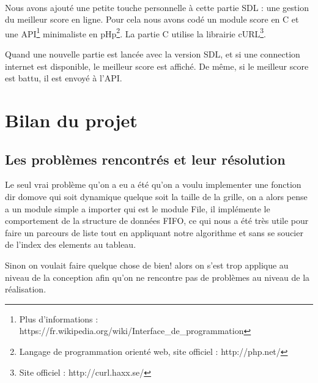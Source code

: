 \documentclass[12pt]{article}
\begin{document}
{\\

Nous avons ajouté une petite touche personnelle à cette partie SDL : une gestion du meilleur score en ligne.
Pour cela nous avons codé un module score en C et une API\footnote{Plus d'informations : https://fr.wikipedia.org/wiki/Interface\_de\_programmation} minimaliste en pHp\footnote{Langage de programmation orienté web, site officiel : http://php.net/}. La partie C utilise la librairie cURL\footnote{Site officiel : http://curl.haxx.se/}.

Quand une nouvelle partie est lancée avec la version SDL, et si une connection internet est disponible, le meilleur score est affiché. De même, si le meilleur score est battu, il est envoyé à l'API.

\section{Bilan du projet}
\subsection{Les problèmes rencontrés et leur résolution}
Le seul vrai problème qu'on a eu a été qu'on a voulu implementer une fonction dir domove qui soit dynamique quelque soit la taille de la grille, on a alors pense a un module simple a importer qui est le module File, il implémente le comportement de la structure de données FIFO, ce qui nous a été très utile pour faire un parcours de liste tout en appliquant notre algorithme et sans se soucier de l'index des elements au tableau.

Sinon on voulait faire quelque chose de bien! alors on s'est trop applique au niveau de la conception afin qu'on ne rencontre pas de problèmes au niveau de la réalisation.

}
\end{document}
